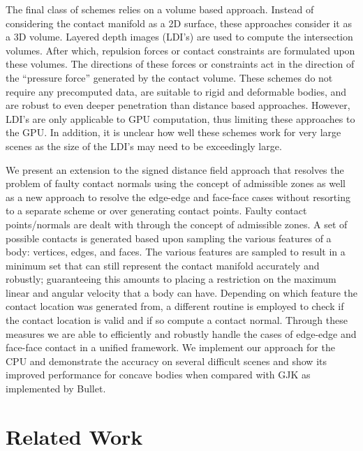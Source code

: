 \documentclass[9pt,twocolumn]{article}
\begin{document}
The final class of schemes relies on a volume based approach. Instead of considering the contact manifold as a 2D surface, these approaches consider it as a 3D volume. Layered depth images (LDI's) are used to compute the intersection volumes. After which, repulsion forces or contact constraints are formulated upon these volumes. The directions of these forces or constraints act in the direction of the ``pressure force'' generated by the contact volume.  These schemes do not require any precomputed data, are suitable to rigid and deformable bodies, and are robust to even deeper penetration than distance based approaches. However, LDI's are only applicable to GPU computation, thus limiting these approaches to the GPU. In addition, it is unclear how well these schemes work for very large scenes as the size of the LDI's may need to be exceedingly large. \newline

We present an extension to the signed distance field approach that resolves the problem of faulty contact normals using the concept of admissible zones\cite{English} as well as a new approach to resolve the edge-edge and face-face cases without resorting to a separate scheme or over generating contact points. Faulty contact points/normals are dealt with through the concept of  admissible zones. A set of possible contacts is generated based upon sampling the various features of a body: vertices, edges, and faces. The various features are sampled to result in a minimum set that can still represent the contact manifold accurately and robustly; guaranteeing this amounts to placing a restriction on the maximum linear and angular velocity that a body can have. Depending on which feature the contact  location was generated from, a different routine is employed to check if the contact location is valid and if so compute a contact normal. Through these measures we are able to efficiently and robustly handle the cases of edge-edge and face-face contact in a unified framework.  We implement our approach for the CPU  and demonstrate the accuracy on several difficult scenes and show its improved performance for concave bodies when compared with GJK as implemented by Bullet.

\section{Related Work}
\end{document}
